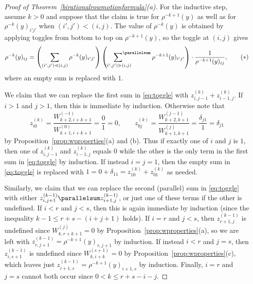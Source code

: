 \begin{proof}[Proof of Theorem~\ref{birationalrowmotionformula}(a)]
For the inductive step, assume $k > 0$ and suppose that the claim is true for $\rho^{-k+1}(y)$ as well as for $\rho^{-k}(y)_{i'j'}$ when $(i',j') < (i,j)$. The value of $\rho^{-k}(y)$ is obtained by applying toggles from bottom to top on $\rho^{-k+1}(y)$, so the toggle at $(i,j)$ gives
\[\rho^{-k}(y)_{ij} = \left(\sum_{(i',j')\lessdot (i,j)} \rho^{-k}(y)_{i'j'}\right)\left(\;\;\;\sideset{}{^{\parallelsum}}\sum_{(i',j') \gtrdot (i,j)}\rho^{-k+1}(y)_{i'j'}\right) \cdot \frac{1}{\rho^{-k+1}(y)_{ij}}, \tag{$*$} \label{eq:toggle}\]
where an empty sum is replaced with $1$. 

We claim that we can replace the first sum in \eqref{eq:toggle} with $z_{i,j-1}^{(k)}+z_{i-1,j}^{(k)}$. If $i > 1$ and $j > 1$, then this is immediate by induction. Otherwise note that
\[
    z_{i0}^{(k)} = \frac{W_{k+2,i+k+1}^{(-1)}}{W_{k+1,i+k+1}^{(0)}} = \frac01= 0,\qquad
    z_{0j}^{(k)} = \frac{W_{k+2,k+1}^{(j-1)}}{W_{k+1,k+1}^{(j)}} = \frac{\delta_{j1}}{1} = \delta_{j1}
\]
by Proposition~\ref{prop:wproperties}(a) and (b).
Thus if exactly one of $i$ and $j$ is $1$, then one of $z_{i,j-1}^{(k)}$ and $z_{i-1,j}^{(k)}$ equals $0$ while the other is the only term in the first sum in \eqref{eq:toggle} by induction. If instead $i=j=1$, then the empty sum in \eqref{eq:toggle} is replaced with $1=0 + \delta_{11} = z_{10}^{(k)} + z_{01}^{(k)}$ as needed.

Similarly, we claim that we can replace the second (parallel) sum in \eqref{eq:toggle} with either $z_{i,j+1}^{(k-1)} \parallelsum z_{i+1,j}^{(k-1)}$, or just one of these terms if the other is undefined. If $i < r$ and $j < s$, then this is again immediate by induction (since the inequality $k-1 \leq r+s-(i+j+1)$ holds). If $i=r$ and $j < s$, then $z_{r+1,j}^{(k-1)}$ is undefined since $W_{k,r+k+1}^{(j)}=0$ by Proposition~\ref{prop:wproperties}(a), so we are left with $z_{r,j+1}^{(k-1)} = \rho^{-k+1}(y)_{r,j+1}$ by induction. If instead $i < r$ and $j=s$, then $z_{i,s+1}^{(k-1)}$ is undefined since $W_{k,i+k}^{(s+1)} = 0$ by Proposition~\ref{prop:wproperties}(c), which leaves just $z_{i+1,s}^{(k-1)} = \rho^{-k+1}(y)_{i+1,s}$ by induction. Finally, $i=r$ and $j=s$ cannot both occur since $0 < k \leq r+s-i-j$.


\end{proof}
